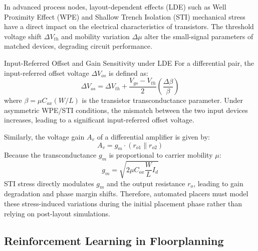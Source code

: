 In advanced process nodes, layout-dependent effects (LDE) such as Well Proximity Effect (WPE) and Shallow Trench Isolation (STI) mechanical stress have a direct impact on the electrical characteristics of transistors. The threshold voltage shift $\Delta V_{th}$ and mobility variation $\Delta \mu$ alter the small-signal parameters of matched devices, degrading circuit performance. 

    \begin{thesiscallout}{Input-Referred Offset and Gain Sensitivity under LDE}
    For a differential pair, the input-referred offset voltage $\Delta V_{os}$ is defined as:
    \begin{equation}
        \Delta V_{os} = \Delta V_{th} + \frac{V_{gs} - V_{th}}{2} \left( \frac{\Delta \beta}{\beta} \right)
    \end{equation}
    where $\beta = \mu C_{ox} (W/L)$ is the transistor transconductance parameter. Under asymmetric WPE/STI conditions, the mismatch between the two input devices increases, leading to a significant input-referred offset voltage. 

    Similarly, the voltage gain $A_v$ of a differential amplifier is given by:
    \begin{equation}
        A_v = g_m \cdot (r_{o1} \parallel r_{o2})
    \end{equation}
    Because the transconductance $g_m$ is proportional to carrier mobility $\mu$:
    \begin{equation}
        g_m = \sqrt{2 \mu C_{ox} \frac{W}{L} I_d}
    \end{equation}
    STI stress directly modulates $g_m$ and the output resistance $r_o$, leading to gain degradation and phase margin shifts. Therefore, automated placers must model these stress-induced variations during the initial placement phase rather than relying on post-layout simulations.
    \end{thesiscallout}

\subsection{Reinforcement Learning in Floorplanning}

